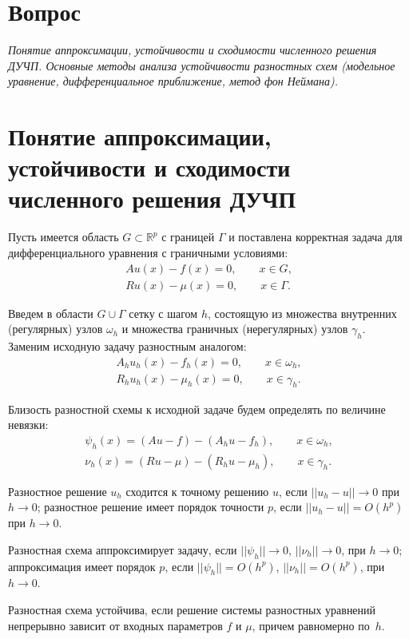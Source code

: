 \documentclass[a4paper,12pt]{article}
\begin{document}
\section*{Вопрос }
{\em Понятие аппроксимации, устойчивости и сходимости численного
решения ДУЧП. Основные методы анализа устойчивости разностных схем
(модельное уравнение, дифференциальное приближение, метод фон Неймана).}


\section{Понятие аппроксимации, устойчивости и сходимости численного
решения ДУЧП}

Пусть имеется область $G\subset\mathbb{R}^p$ с границей $\Gamma$ и
поставлена корректная задача для дифференциального уравнения
с граничными условиями:
\begin{gather*}
Au(x)-f(x)=0,\qquad x\in G,\\
Ru(x)-\mu(x)=0,\qquad x\in\Gamma.
\end{gather*}

Введем в области $G\cup\Gamma$ сетку с шагом $h$, состоящую из множества
внутренних (регулярных) узлов $\omega_h$ и множества граничных (нерегулярных)
узлов $\gamma_h$. Заменим исходную задачу разностным аналогом:
\begin{gather*}
A_hu_h(x)-f_h(x)=0,\qquad x\in\omega_h,\\
R_hu_h(x)-\mu_h(x)=0,\qquad x\in\gamma_h.
\end{gather*}

Близость разностной схемы к исходной задаче будем определять
по величине невязки:
\begin{gather*}
\psi_h(x)=(Au-f)-(A_hu-f_h),\qquad x\in\omega_h,\\
\nu_h(x)=(Ru-\mu)-(R_hu-\mu_h),\qquad x\in\gamma_h.
\end{gather*}

Разностное решение $u_h$ сходится к точному решению $u$, если
$||u_h-u||\to0$ при $h\to0$;
разностное решение имеет порядок точности $p$, если
$||u_h-u||=O(h^p)$ при $h\to0$.

Разностная схема аппроксимирует задачу, если
$||\psi_h||\to0$, $||\nu_h||\to0$, при $h\to0$;
аппроксимация имеет порядок $p$, если
$||\psi_h||=O(h^p)$, $||\nu_h||=O(h^p)$, при $h\to0$.

Разностная схема устойчива, если решение системы разностных уравнений
непрерывно зависит от входных параметров $f$ и $\mu$, причем равномерно
по~$h$.
\end{document}
